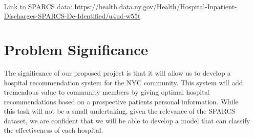\documentclass{article}
\begin{document}
\paragraph{} Link to SPARCS data: \href{url}{https://health.data.ny.gov/Health/Hospital-Inpatient-Discharges-SPARCS-De-Identified/u4ud-w55t}


 \section{Problem Significance}
 
The significance of our proposed project is that it will allow us to develop a hospital recommendation system for the NYC community. This system will add tremendous value to community members by giving optimal hospital recommendations based on a prospective patients personal information. While this task will not be a small undertaking, given the relevance of the SPARCS dataset, we are confident that we will be able to develop a model that can classify the effectiveness of each hospital. 
  
  
\end{document}
